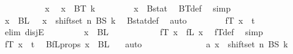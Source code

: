 \begin{isabellebody}
\ \ \ \isamarkupfalse%
\isanewline
\ \ \ \ \ \isamarkupfalse%
\ x\ \isamarkupfalse%
\ {\isachardoublequoteopen}x\ {\isasymin}\ BT\ {\isacharparenleft}{\kern0pt}k{\isacharplus}{\kern0pt}{}{\isacharparenright}{\kern0pt}{\isachardoublequoteclose}\isanewline
\ \ \ \ \ \isamarkupfalse%
\ \isamarkupfalse%
\ {\isachardoublequoteopen}x\ {\isasymin}\ Bstat{\isachardoublequoteclose}\ \isamarkupfalse%
\ BT{\isacharunderscore}{\kern0pt}def\ \isamarkupfalse%
\ simp\isanewline
\ \ \ \ \ \isamarkupfalse%
\ \isamarkupfalse%
\ {\isachardoublequoteopen}x\ {\isasymin}\ BL\ {}\ {\isasymor}\ x\ {\isasymin}\ shiftset\ n\ {\isacharparenleft}{\kern0pt}BS\ k{\isacharparenright}{\kern0pt}{\isachardoublequoteclose}\ \isamarkupfalse%
\ Bstat{\isacharunderscore}{\kern0pt}def\ \isamarkupfalse%
\ auto\isanewline
\ \ \ \ \ \isamarkupfalse%
\ \isamarkupfalse%
\ {\isachardoublequoteopen}fT\ x\ {\isasymin}\ {\isacharbraceleft}{\kern0pt}{\isachardot}{\kern0pt}{\isachardot}{\kern0pt}{\isacharless}{\kern0pt}t\ {\isacharplus}{\kern0pt}\ {}{\isacharbraceright}{\kern0pt}{\isachardoublequoteclose}\isanewline
\ \ \ \ \ \isamarkupfalse%
\ {\isacharparenleft}{\kern0pt}elim\ disjE{\isacharparenright}{\kern0pt}\isanewline
\ \ \ \ \ \ \ \isamarkupfalse%
\ {\isachardoublequoteopen}x\ {\isasymin}\ BL\ {}{\isachardoublequoteclose}\isanewline
\ \ \ \ \ \ \ \isamarkupfalse%
\ \isamarkupfalse%
\ {\isachardoublequoteopen}fT\ x\ {\isacharequal}{\kern0pt}\ fL\ x{\isachardoublequoteclose}\ \isamarkupfalse%
\ fT{\isacharunderscore}{\kern0pt}def\ \isamarkupfalse%
\ simp\isanewline
\ \ \ \ \ \ \ \isamarkupfalse%
\ \isamarkupfalse%
\ {\isachardoublequoteopen}fT\ x\ {\isasymin}\ {\isacharbraceleft}{\kern0pt}{\isachardot}{\kern0pt}{\isachardot}{\kern0pt}{\isacharless}{\kern0pt}t{\isacharplus}{\kern0pt}{}{\isacharbraceright}{\kern0pt}{\isachardoublequoteclose}\ \isamarkupfalse%
\ BfL{\isacharunderscore}{\kern0pt}props\ {\isacartoucheopen}x\ {\isasymin}\ BL\ {}{\isacartoucheclose}\ \isamarkupfalse%
\ auto\isanewline
\ \ \ \ \ \isamarkupfalse%
\isanewline
\ \ \ \ \ \ \ \isamarkupfalse%
\ a{\isacharcolon}{\kern0pt}\ {\isachardoublequoteopen}x\ {\isasymin}\ shiftset\ n\ {\isacharparenleft}{\kern0pt}BS\ k{\isacharparenright}{\kern0pt}{\isachardoublequoteclose}\isanewline

\end{isabellebody}
